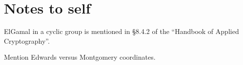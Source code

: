 \documentclass{amsproc}
\begin{document}
\section{Notes to self}
ElGamal in a cyclic group is mentioned in \S8.4.2 of 
the ``Handbook of Applied Cryptography''.

Mention Edwards versus Montgomery coordinates.
\end{document}
